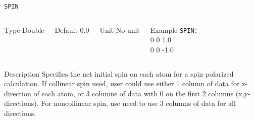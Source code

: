 \documentclass[xcolor=dvipsnames,t]{beamer}
\begin{document}
\begin{frame}[allowframebreaks]{\texttt{SPIN}} \label{SPIN}
\vspace*{-12pt}
\begin{columns}
\begin{block}{Type}
Double
\end{block}

\begin{block}{Default}
0.0
\end{block}

\begin{block}{Unit}
No unit
\end{block}

\begin{block}{Example}
\texttt{SPIN: \\}
0 0 1.0 \\
0 0 -1.0
\end{block}
\end{columns}

\begin{block}{Description}
Specifies the net initial spin on each atom for a spin-polarized calculation. If collinear spin used, user could use either 1 column of data for z-direction of each atom, or 3 columns of data with 0 on the first 2 columns (x,y-directions). For noncollinear spin, use need to use 3 columns of data for all directions. 
\end{block}

\end{frame}
\end{document}
